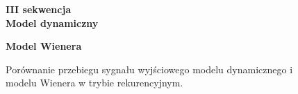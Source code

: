 \newpage

\begin{figure}[h!]

\begin{center}
\Large \textbf{III sekwencja} \\
\vspace{0.5cm}
\Large \textbf{Model dynamiczny}
\end{center}

\centering
{}
\hfill
{}

\begin{center}
\Large \textbf{Model Wienera}
\end{center}

\hfill
{}
\caption{Porównanie przebiegu sygnału wyjściowego modelu dynamicznego i modelu Wienera w trybie rekurencyjnym.}
\end{figure}

